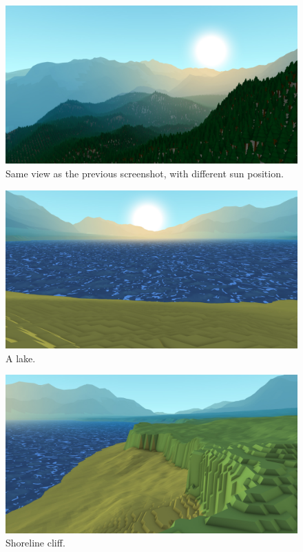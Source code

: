 \begin{figure}
	\centering
		\includegraphics[width=1.0\textwidth]{figures/Screenshot000004.jpg}
	\caption{Same view as the previous screenshot, with different sun position.}
	\label{fig:screenshot04}
\end{figure}

\begin{figure}
	\centering
		\includegraphics[width=1.0\textwidth]{figures/Screenshot000005.jpg}
	\caption{A lake.}
	\label{fig:screenshot05}
\end{figure}

\begin{figure}
	\centering
		\includegraphics[width=1.0\textwidth]{figures/Screenshot000006.jpg}
	\caption{Shoreline cliff.}
	\label{fig:screenshot06}
\end{figure}

